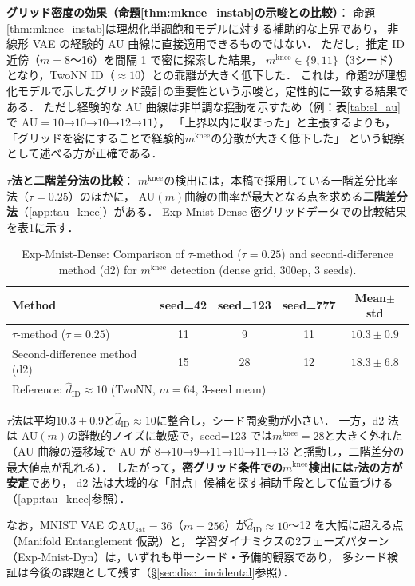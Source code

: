 \documentclass[11pt,a4paper]{jsarticle}
\newcommand{\AUsat}{\mathrm{AU}_{\mathrm{sat}}}
\newcommand{\mknee}{m^{\mathrm{knee}}}
\begin{document}
\noindent
\textbf{グリッド密度の効果（命題\ref{thm:mknee_instab}の示唆との比較）}：
命題\ref{thm:mknee_instab}は理想化単調飽和モデルに対する補助的な上界であり，
非線形 VAE の経験的 AU 曲線に直接適用できるものではない．
ただし，推定 ID 近傍（$m = 8$〜16）を間隔 1 で密に探索した結果，
$\mknee \in \{9, 11\}$（3シード）となり，TwoNN ID（$\approx 10$）との乖離が大きく低下した．
これは，命題2が理想化モデルで示したグリッド設計の重要性という示唆と，定性的に一致する結果である．
ただし経験的な AU 曲線は非単調な揺動を示すため（例：表\ref{tab:el_au}で AU$=10$→$10$→$10$→$12$→$11$），
「上界以内に収まった」と主張するよりも，「グリッドを密にすることで経験的$\mknee$の分散が大きく低下した」
という観察として述べる方が正確である．

\noindent
\textbf{$\tau$法と二階差分法の比較}：
$\mknee$の検出には，本稿で採用している一階差分比率法（$\tau = 0.25$）のほかに，
AU$(m)$曲線の曲率が最大となる点を求める\textbf{二階差分法}（\ref{app:tau_knee}）がある．
Exp-Mnist-Dense 密グリッドデータでの比較結果を表\ref{tab:el_knee_compare}に示す．

\begin{table}[H]
\centering
\caption{Exp-Mnist-Dense: Comparison of $\tau$-method ($\tau=0.25$) and second-difference method (d2) for $\mknee$ detection (dense grid, 300ep, 3 seeds).}
\label{tab:el_knee_compare}
\small
\begin{tabular}{lcccc}
\toprule
Method & seed=42 & seed=123 & seed=777 & Mean$\pm$std \\
\midrule
$\tau$-method ($\tau=0.25$) & 11 & 9  & 11 & $10.3 \pm 0.9$ \\
Second-difference method (d2) & 15 & 28 & 12 & $18.3 \pm 6.8$ \\
\midrule
\multicolumn{5}{l}{Reference: $\hat{d}_\mathrm{ID} \approx 10$ (TwoNN, $m=64$, 3-seed mean)} \\
\bottomrule
\end{tabular}
\end{table}

$\tau$法は平均$10.3 \pm 0.9$と$\hat{d}_\mathrm{ID} \approx 10$に整合し，シード間変動が小さい．
一方，d2 法は AU$(m)$の離散的ノイズに敏感で，seed=123 では$\mknee = 28$と大きく外れた
（AU 曲線の遷移域で AU が 8→10→9→11→10→11→13 と揺動し，二階差分の最大値点が乱れる）．
したがって，\textbf{密グリッド条件での$\mknee$検出には$\tau$法の方が安定}であり，
d2 法は大域的な「肘点」候補を探す補助手段として位置づける（\ref{app:tau_knee}参照）．

なお，MNIST VAE の$\AUsat = 36$（$m=256$）が$\hat{d}_\mathrm{ID} \approx 10$〜12 を大幅に超える点（Manifold Entanglement 仮説）と，
学習ダイナミクスの2フェーズパターン（Exp-Mnist-Dyn）は，いずれも単一シード・予備的観察であり，
多シード検証は今後の課題として残す（§\ref{sec:disc_incidental}参照）．
\end{document}
